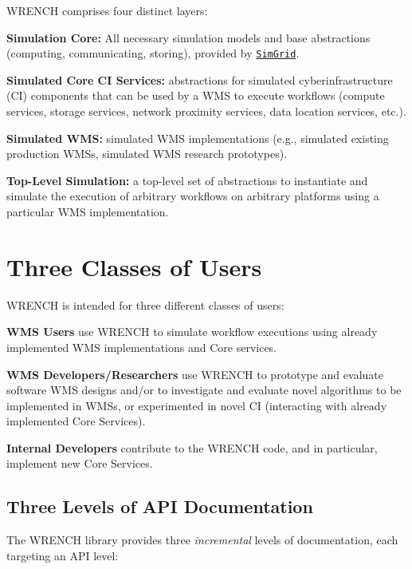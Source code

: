 W\+R\+E\+N\+CH comprises four distinct layers\+:


\begin{DoxyItemize}
\item {\bfseries Simulation Core\+:} All necessary simulation models and base abstractions (computing, communicating, storing), provided by \href{http://simgrid.gforge.inria.fr}{\tt Sim\+Grid}.
\item {\bfseries Simulated Core CI Services\+:} abstractions for simulated cyberinfrastructure (CI) components that can be used by a W\+MS to execute workflows (compute services, storage services, network proximity services, data location services, etc.).
\item {\bfseries Simulated W\+MS\+:} simulated W\+MS implementations (e.\+g., simulated existing production W\+M\+Ss, simulated W\+MS research prototypes).
\item {\bfseries Top-\/\+Level Simulation\+:} a top-\/level set of abstractions to instantiate and simulate the execution of arbitrary workflows on arbitrary platforms using a particular W\+MS implementation.
\end{DoxyItemize}

\hypertarget{index_overview-users}{}\section{Three Classes of Users}\label{index_overview-users}
W\+R\+E\+N\+CH is intended for three different classes of users\+:


\begin{DoxyItemize}
\item {\bfseries W\+MS Users} use W\+R\+E\+N\+CH to simulate workflow executions using already implemented W\+MS implementations and Core services.
\item {\bfseries W\+MS Developers/\+Researchers} use W\+R\+E\+N\+CH to prototype and evaluate software W\+MS designs and/or to investigate and evaluate novel algorithms to be implemented in W\+M\+Ss, or experimented in novel CI (interacting with already implemented Core Services).
\item {\bfseries Internal Developers} contribute to the W\+R\+E\+N\+CH code, and in particular, implement new Core Services.
\end{DoxyItemize}\hypertarget{index_overview-users-levels}{}\subsection{Three Levels of A\+P\+I Documentation}\label{index_overview-users-levels}
The W\+R\+E\+N\+CH library provides three {\itshape incremental} levels of documentation, each targeting an A\+PI level\+:

